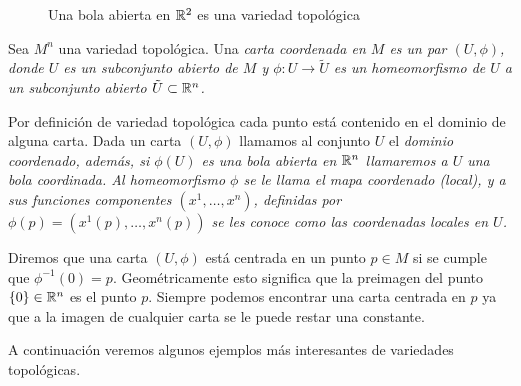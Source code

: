 \begin{figure}
	\centering
	
	\caption{Una bola abierta en $\mathbb{R}^{2}$ es una variedad topológica}
\end{figure}


\begin{definition}\label{Definición: Cartas Coordenadas}
	Sea $M^n$ una variedad topológica. Una \it{carta coordenada} en $M$ es un par $(U, \phi)$, donde $U$ es un subconjunto abierto de $M$ y $\phi: U \to \tilde{U}$ es un homeomorfismo de $U$ a un subconjunto abierto $\tilde{U} \subset \mathbb{R}^n$.
\end{definition}

Por definición de variedad topológica cada punto está contenido en el dominio de alguna carta. Dada un carta $(U,\phi)$ llamamos al conjunto $U$ el \it{dominio coordenado}, además, si $\phi(U)$ es una bola abierta en $\mathbb{R}^n$ llamaremos a $U$ una \it{bola coordinada}. Al homeomorfismo $\phi$ se le llama el \it{mapa coordenado (local)}, y a sus funciones componentes $(x^1,\hdots,x^n)$, definidas por $\phi(p) = (x^1(p), \hdots, x^n(p))$ se les conoce como las \it{coordenadas locales} en $U$.

Diremos que una carta $(U,\phi)$ está centrada en un punto $p \in M$ si se cumple que $\phi^{-1}(0) = p$. Geométricamente esto significa que la preimagen del punto $\{0\} \in \mathbb{R}^{n}$ es el punto $p$. Siempre podemos encontrar una carta centrada en $p$ ya que a la imagen de cualquier carta se le puede restar una constante.

A continuación veremos algunos ejemplos más interesantes de variedades topológicas.

